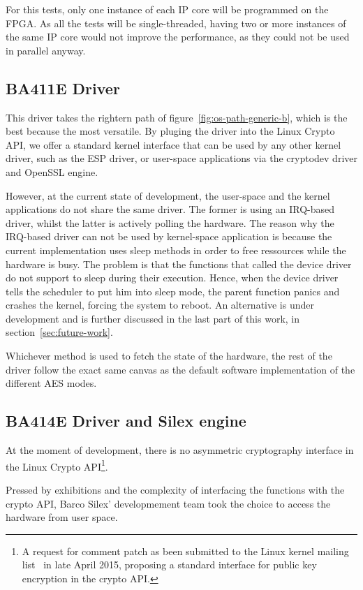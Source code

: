 For this tests, only one instance of each IP core will be programmed on the FPGA.
As all the tests will be single-threaded, having two or more instances of the same IP core would not improve the performance, as they could not be used in parallel anyway.

\subsection{BA411E Driver}\label{sec:implem-ba411e-driver}
This driver takes the rightern path of figure~\ref{fig:os-path-generic-b}, which is the best because the most versatile.
By pluging the driver into the Linux Crypto API, we offer a standard kernel interface that can be used by any other kernel driver, such as the ESP driver, or user-space applications via the cryptodev driver and OpenSSL engine.

However, at the current state of development, the user-space and the kernel applications do not share the same driver.
The former is using an IRQ-based driver, whilst the latter is actively polling the hardware.
The reason why the IRQ-based driver can not be used by kernel-space application is because the current implementation uses sleep methods in order to free ressources while the hardware is busy.
The problem is that the functions that called the device driver do not support to sleep during their execution.
Hence, when the device driver tells the scheduler to put him into sleep mode, the parent function panics and crashes the kernel, forcing the system to reboot.
An alternative is under development and is further discussed in the last part of this work, in section~\ref{sec:future-work}. \newline{}

Whichever method is used to fetch the state of the hardware, the rest of the driver follow the exact same canvas as the default software implementation of the different AES modes.


\subsection{BA414E Driver and Silex engine}
At the moment of development, there is no asymmetric cryptography interface in the Linux Crypto API\footnote{A request for comment patch as been submitted to the Linux kernel mailing list~\cite{crypto-api-pk-encryption} in late April 2015, proposing a standard interface for public key encryption in the crypto API.}.

Pressed by exhibitions and the complexity of interfacing the functions with the crypto API, Barco Silex' developmement team took the choice to access the hardware from user space.


